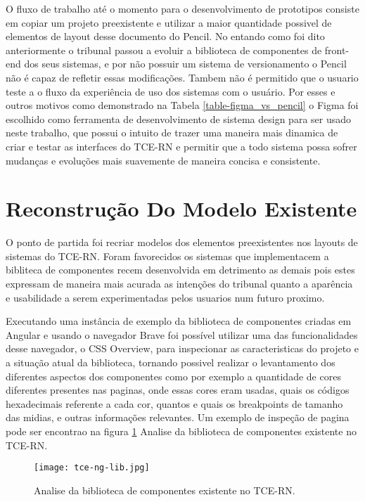   O fluxo de trabalho até o momento para o desenvolvimento de prototipos consiste em copiar um projeto preexistente e utilizar a maior quantidade possivel de elementos de layout desse documento do Pencil. No entando como foi dito anteriormente o tribunal passou a evoluir a biblioteca de componentes de front-end dos seus sistemas, e por não possuir um sistema de versionamento o Pencil não é capaz de refletir essas modificações. Tambem não é permitido que o usuario teste a o fluxo da experiência de uso dos sistemas com o usuário. Por esses e outros motivos como demonstrado na Tabela \ref{table-figma_vs_pencil} o Figma foi escolhido como ferramenta de desenvolvimento de sistema design para ser usado neste trabalho, que possui o intuito de trazer uma maneira mais dinamica de criar e testar as interfaces do TCE-RN e permitir que a todo sistema possa sofrer mudanças e evoluções mais suavemente de maneira concisa e consistente.

\section{Reconstrução Do Modelo Existente} \label{secao32}

  O ponto de partida foi recriar modelos dos elementos preexistentes nos layouts de sistemas do TCE-RN. Foram favorecidos os sistemas que implementacem a bibliteca de componentes recem desenvolvida em detrimento as demais pois estes expressam de maneira mais acurada as intenções do tribunal quanto a aparência e usabilidade a serem experimentadas pelos usuarios num futuro proximo.

  Executando uma instância de exemplo da biblioteca de componentes criadas em Angular e usando o navegador Brave foi possível utilizar uma das funcionalidades desse navegador, o CSS Overview, para inspecionar as caracteristicas do projeto e a situação atual da biblioteca, tornando possivel realizar o levantamento dos diferentes aspectos dos componentes como por exemplo a quantidade de cores diferentes presentes nas paginas, onde essas cores eram usadas, quais os códigos hexadecimais referente a cada cor, quantos e quais os breakpoints de tamanho das midias, e outras informações relevantes. Um exemplo de inspeção de pagina pode ser encontrao na figura \ref{fig:tcenglib} Analise da biblioteca de componentes existente no TCE-RN.

  \begin{figure}[!h]
    \texttt{[image: tce-ng-lib.jpg]}
    \caption{Analise da biblioteca de componentes existente no TCE-RN.}
    \label{fig:tcenglib}
  \end{figure}

